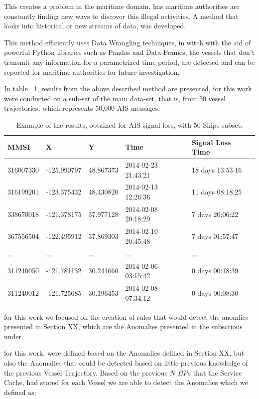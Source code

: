 This creates a problem in the maritime domain, has maritime authorities are constantly finding new ways to discover this illegal activities. A method that looks into historical or new streams of data, was developed. 

This method efficiently uses Data Wrangling techniques, in witch with the aid of powerful Python libraries such as Pandas and Data-Frames, the vessels that don't transmit any information for a parametrized time period, are detected and can be reported for maritime authorities for future investigation.

In table ~\ref{Table: AIS signal loss}, results from the above described method are presented, for this work were conducted on a sub-set of the main data-set, that is, from 50 vessel trajectories, which represents 50,000 AIS messages.

\begin{table}[H]
\centering
\caption{Example of the results, obtained for AIS signal loss, with 50 Ships subset.}
\label{Table: AIS signal loss}
\begin{tabular}{@{}lllll@{}}
\toprule
MMSI & X & Y & Time & Signal Loss Time \\ \midrule
316007330 & -125.990797 & 48.867373 & 2014-02-23 21:43:21 & 18 days 13:53:16 \\
316199201 & -123.375432 & 48.430820 & 2014-02-13 12:26:36 & 11 days 08:18:25 \\
338670018 & -121.378175 & 37.977128 & 2014-02-08 20:18:29 & 7 days 20:06:22 \\
367556504 & -122.495912 & 37.869303 & 2014-02-10 20:45:48 & 7 days 01:57:47 \\
... & ... & ... & ... & ... \\
311240050 & -121.781132 & 30.241660 & 2014-02-06 03:15:42 & 0 days 00:18:39 \\
311240012 & -121.725685 & 30.196453 & 2014-02-08 07:34:12 & 0 days 00:08:30 \\ 
\bottomrule
\end{tabular}
\end{table}
for this work we focused on the creation of rules that would detect the anomlies presented in Section XX, which are the Anomalies presented in the subsctions under.  

for this work, were defined based on the Anomalies defined in Section XX, but also the Anomalies that could be detected based on little previous knowledge of the previous Vessel Trajectory. Based on the previous $N$ $BPs$ that the Service Cache, had stored for each Vessel we are able to detect the Anomalies which we defined as: 

